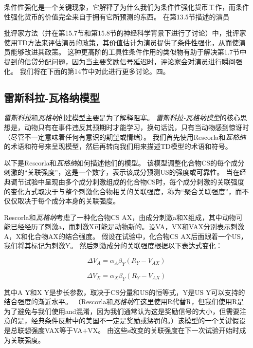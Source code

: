 条件性强化是一个关键现象，它解释了为什么我们为条件性强化货币工作，而条件性强化货币的价值完全来自于拥有它所预测的东西。
在第13.5节描述的演员{批评家方法（并在第15.7节和第15.8节的神经科学背景下进行了讨论）中，批评家使用TD方法来评估演员的政策，其价值估计为演员提供了条件性强化，从而使演员能够改进其政策。
这种更高阶的工具性条件作用的类似物有助于解决第1.7节中提到的信贷分配问题，因为当主要奖励信号延迟时，评论家会对演员进行瞬间强化。
我们将在下面的第14节中对此进行更多讨论。四。


\subsection{雷斯科拉-瓦格纳模型}

\textit{雷斯科拉}和\textit{瓦格纳}创建模型主要是为了解释阻塞。
\textit{雷斯科拉-瓦格纳模型}的核心思想是，动物只有在事件违反其预期时才能学习，换句话说，只有当动物感到惊讶时（尽管不一定意味着任何有意识的期望或情绪）。
我们首先使用Rescorla和\textit{瓦格纳}的术语和符号来呈现模型，然后再转向我们用来描述TD模型的术语和符号。


以下是Rescorla和\textit{瓦格纳}如何描述他们的模型。
该模型调整化合物CS的每个成分刺激的“关联强度”，这是一个数字，表示该成分预测US的强度或可靠性。
当在经典调节试验中呈现由多个成分刺激组成的化合物CS时，每个成分刺激的关联强度的变化方式取决于与整个刺激化合物相关的关联强度，称为“聚合关联强度”，而不仅仅取决于每个成分本身的关联强度。


Rescorla和\textit{瓦格纳}考虑了一种化合物CS AX，由成分刺激a和X组成，其中动物可能已经经历了刺激a，而刺激X可能是动物新的。设VA，VX和VAX分别表示刺激A，X和化合物AX的结合强度。
假设在试验中，化合物CS AX后面跟着一个US，我们将其标记为刺激Y。
然后刺激成分的关联强度根据以下表达式变化：

\begin{equation}
	\Delta V_A = \alpha_A \beta_Y
		(R_Y - V_{AX})
\end{equation}


\begin{equation}
	\Delta V_X = 
		\alpha_X \beta_Y
		(R_Y - V_{AX})
\end{equation}

其中A Y和X Y是步长参数，取决于CS分量和US的恒等式，Y是US Y可以支持的结合强度的渐近水平。
（Rescorla和\textit{瓦格纳}在这里使用R代替R，但我们使用R是为了避免与我们使用and混淆，因为我们通常认为这是奖励信号的大小，但需要注意的是，经典条件反射中的美国不一定是奖励或惩罚的。）该模型的一个关键假设是总联想强度VAX等于VA+VX。
由这些s改变的关联强度在下一次试验开始时成为关联强度。


}
